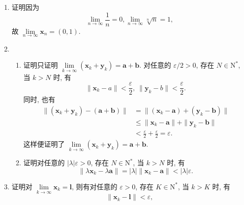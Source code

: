 % 
\begin{enumerate}
    \item %
        {\heiti 证明}\quad 因为
        \[
            \lim_{n\to\infty}\frac1n = 0, \lim_{n\to\infty}\sqrt[n]{n} = 1,    
        \]
        故 $\lim\limits_{n\to\infty}\boldsymbol{x}_n = (0, 1)$.
    \item %
        \begin{enumerate}[(1)]
            \item %
                {\heiti 证明}\quad 只证明 $\lim\limits_{k\to\infty}(\boldsymbol{x}_k + \boldsymbol{y}_k) = \boldsymbol{a} + \boldsymbol{b}$.
                对任意的 $\varepsilon / 2 > 0$, 存在 $N \in \mathrm{N}^*$, 当 $k > N$ 时, 有
                \[
                    \| \boldsymbol{x}_k - a \| < \frac{\varepsilon}{2},\ \| \boldsymbol{y}_k - b \| < \frac{\varepsilon}{2}.    
                \]
                同时, 也有
                \begin{align*}
                    \| (\boldsymbol{x}_k + \boldsymbol{y}_k) - (\boldsymbol{a} + \boldsymbol{b}) \| &= \| (\boldsymbol{x}_k - \boldsymbol{a}) + (\boldsymbol{y}_k - \boldsymbol{b}) \| \\
                    &\leqslant \| \boldsymbol{x}_k - \boldsymbol{a} \| + \| \boldsymbol{y}_k - \boldsymbol{b} \| \\
                    &< \frac{\varepsilon}{2} + \frac{\varepsilon}{2} = \varepsilon.
                \end{align*}
                这样便证明了 $\lim\limits_{k\to\infty}(\boldsymbol{x}_k + \boldsymbol{y}_k) = \boldsymbol{a} + \boldsymbol{b}$.
            \item %
                {\heiti 证明}\quad 对任意的 $|\lambda|\varepsilon > 0$, 存在 $N \in \mathrm{N}^*$, 当 $k > N$ 时, 有
                \[
                    \| \lambda\boldsymbol{x}_k - \lambda\boldsymbol{a} \| = |\lambda|\| \boldsymbol{x}_k - \boldsymbol{a} \| < |\lambda|\varepsilon.    
                \]
        \end{enumerate}
    \item %
        {\heiti 证明}\quad 对 $\lim\limits_{k\to\infty}\boldsymbol{x}_k = \boldsymbol{l}$, 则有对任意的 $\varepsilon > 0$, 存在 $K \in \mathrm{N}^*$, 当 $k > K$ 时, 有
        \[
            \| \boldsymbol{x}_k - \boldsymbol{l} \| < \varepsilon,    
\]
\end{enumerate}
